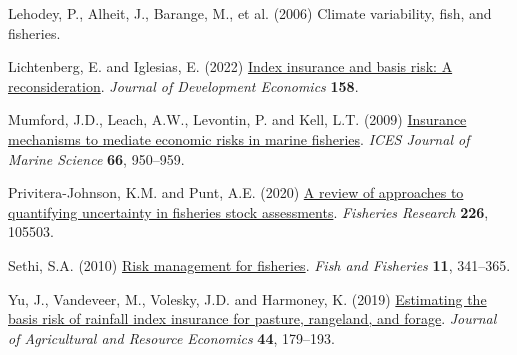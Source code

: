 \documentclass[
  letterpaper,
  DIV=11,
  numbers=noendperiod]{scrartcl}
\newlength{\cslhangindent}
\newlength{\cslentryspacingunit} %
\newenvironment{CSLReferences}[2] %
 {%
  \setlength{\parindent}{0pt}
  \ifodd #1
  \let\oldpar\par
  \def\par{\hangindent=\cslhangindent\oldpar}
  \fi
  \setlength{\parskip}{#2\cslentryspacingunit}
 }%
 {}
\begin{document}
\begin{CSLReferences}{1}{0}
\leavevmode{}%
Lehodey, P., Alheit, J., Barange, M., et al. (2006) Climate variability,
fish, and fisheries.

\leavevmode{}%
Lichtenberg, E. and Iglesias, E. (2022)
\href{https://doi.org/10.1016/j.jdeveco.2022.102883}{Index insurance and
basis risk: A reconsideration}. \emph{Journal of Development Economics}
\textbf{158}.

\leavevmode{}%
Mumford, J.D., Leach, A.W., Levontin, P. and Kell, L.T. (2009)
\href{https://doi.org/10.1093/icesjms/fsp100}{Insurance mechanisms to
mediate economic risks in marine fisheries}. \emph{ICES Journal of
Marine Science} \textbf{66}, 950--959.

\leavevmode{}%
Privitera-Johnson, K.M. and Punt, A.E. (2020)
\href{https://doi.org/10.1016/j.fishres.2020.105503}{A review of
approaches to quantifying uncertainty in fisheries stock assessments}.
\emph{Fisheries Research} \textbf{226}, 105503.

\leavevmode{}%
Sethi, S.A. (2010)
\href{https://doi.org/10.1111/j.1467-2979.2010.00363.x}{Risk management
for fisheries}. \emph{Fish and Fisheries} \textbf{11}, 341--365.

\leavevmode{}%
Yu, J., Vandeveer, M., Volesky, J.D. and Harmoney, K. (2019)
\href{https://doi.org/10.22004/ag.econ.281319}{Estimating the basis risk
of rainfall index insurance for pasture, rangeland, and forage}.
\emph{Journal of Agricultural and Resource Economics} \textbf{44},
179--193.

\end{CSLReferences}
\end{document}

